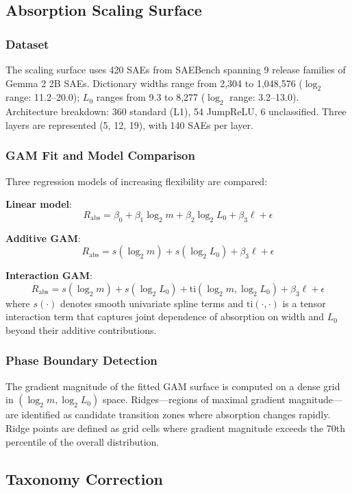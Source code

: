 \documentclass{article}
\begin{document}
\subsection{Absorption Scaling Surface}
\label{sec:scaling}

\subsubsection{Dataset}

The scaling surface uses 420 SAEs from SAEBench spanning 9 release families of Gemma 2 2B SAEs.
Dictionary widths range from 2,304 to 1,048,576 ($\log_2$ range: 11.2--20.0); $L_0$ ranges from 9.3 to 8,277 ($\log_2$ range: 3.2--13.0).
Architecture breakdown: 360 standard (L1), 54 JumpReLU, 6 unclassified.
Three layers are represented (5, 12, 19), with 140 SAEs per layer.

\subsubsection{GAM Fit and Model Comparison}

Three regression models of increasing flexibility are compared:

\textbf{Linear model}:
\[
R_{\text{abs}} = \beta_0 + \beta_1 \log_2 m + \beta_2 \log_2 L_0 + \beta_3 \ell + \epsilon
\]

\textbf{Additive GAM}:
\[
R_{\text{abs}} = s(\log_2 m) + s(\log_2 L_0) + \beta_3 \ell + \epsilon
\]

\textbf{Interaction GAM}:
\[
R_{\text{abs}} = s(\log_2 m) + s(\log_2 L_0) + \text{ti}(\log_2 m, \log_2 L_0) + \beta_3 \ell + \epsilon
\]
where $s(\cdot)$ denotes smooth univariate spline terms and $\text{ti}(\cdot, \cdot)$ is a tensor interaction term that captures joint dependence of absorption on width and $L_0$ beyond their additive contributions.

\subsubsection{Phase Boundary Detection}

The gradient magnitude of the fitted GAM surface is computed on a dense grid in $(\log_2 m, \log_2 L_0)$ space.
Ridges---regions of maximal gradient magnitude---are identified as candidate transition zones where absorption changes rapidly.
Ridge points are defined as grid cells where gradient magnitude exceeds the 70th percentile of the overall distribution.

\subsection{Taxonomy Correction}
\label{sec:taxonomy}
\end{document}

